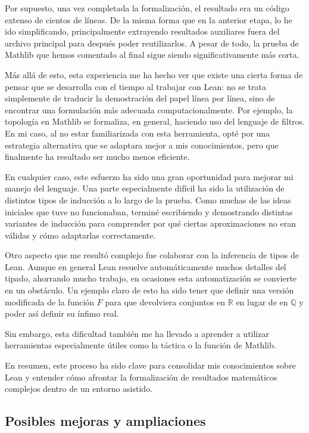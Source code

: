 Por supuesto, una vez completada la formalización, el resultado era un código extenso de cientos de líneas. De la misma forma que en la anterior etapa, lo he ido simplificando, principalmente extrayendo resultados auxiliares fuera del archivo principal para después poder reutilizarlos. A pesar de todo, la prueba de Mathlib que hemos comentado al final sigue siendo significativamente más corta.

Más allá de esto, esta experiencia me ha hecho ver que existe una cierta forma de pensar que se desarrolla con el tiempo al trabajar con Lean: no se trata simplemente de traducir la demostración del papel línea por línea, sino de encontrar una formulación más adecuada computacionalmente. Por ejemplo, la topología en Mathlib se formaliza, en general, haciendo uso del lenguaje de filtros. En mi caso, al no estar familiarizada con esta herramienta, opté por una estrategia alternativa que se adaptara mejor a mis conocimientos, pero que finalmente ha resultado ser mucho menos eficiente.

En cualquier caso, este esfuerzo ha sido una gran oportunidad para mejorar mi manejo del lenguaje. Una parte especialmente difícil ha sido la utilización de distintos tipos de inducción a lo largo de la prueba. Como muchas de las ideas iniciales que tuve no funcionaban, terminé escribiendo y demostrando distintas variantes de inducción para comprender por qué ciertas aproximaciones no eran válidas y cómo adaptarlas correctamente.

Otro aspecto que me resultó complejo fue colaborar con la inferencia de tipos de Lean. Aunque en general Lean resuelve automáticamente muchos detalles del tipado, ahorrando mucho trabajo, en ocasiones esta automatización se convierte en un obstáculo. Un ejemplo claro de esto ha sido tener que definir una versión modificada de la función $F$ para que devolviera conjuntos en $\mathbb{R}$ en lugar de en $\mathbb{Q}$ y poder así definir su ínfimo real.

Sin embargo, esta dificultad también me ha llevado a aprender a utilizar herramientas especialmente útiles como la táctica  o la función  de Mathlib.

En resumen, este proceso ha sido clave para consolidar mis conocimientos sobre Lean y entender cómo afrontar la formalización de resultados matemáticos complejos dentro de un entorno asistido.

\subsection{Posibles mejoras y ampliaciones}

